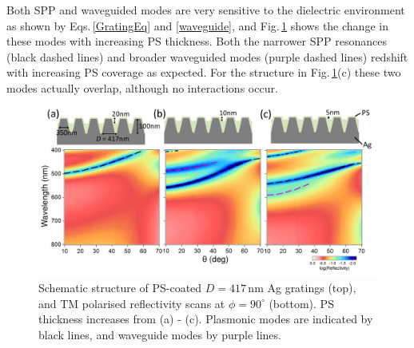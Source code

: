 Both SPP and waveguided modes are very sensitive to the dielectric environment as shown by Eqs.\,\ref{GratingEq} and \ref{waveguide}, and Fig.\,\ref{7Fig13} shows the change in these modes with increasing PS thickness. Both the narrower SPP resonances (black dashed lines) and broader waveguided modes (purple dashed lines) redshift with increasing PS coverage as expected. For the structure in Fig.\,\ref{7Fig13}(c) these two modes actually overlap, although no interactions occur.
\begin{figure}[h!] 
\centering    
\includegraphics[width=\textwidth]{Fig13}
\caption{Schematic structure of PS-coated $D=417$\,nm Ag gratings (top), and TM polarised reflectivity scans at $\phi=90^{\circ}$ (bottom). PS thickness increases from (a) - (c). Plasmonic modes are indicated by black lines, and waveguide modes by purple lines.}
\label{7Fig13}
\end{figure}


